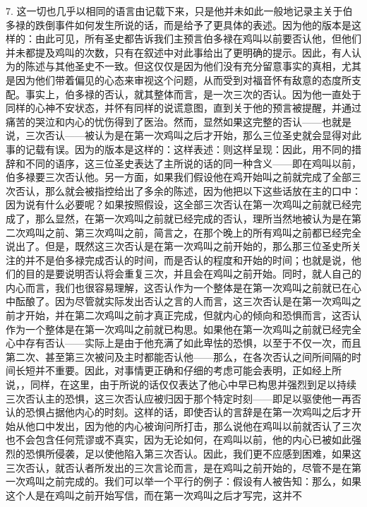 7. 这一切也几乎以相同的语言由记载下来，只是他并未如此一般地记录主关于伯多禄的跌倒事件如何发生所说的话，而是给予了更具体的表述。因为他的版本是这样的：由此可见，所有圣史都告诉我们主预言伯多禄在鸡叫以前要否认他，但他们并未都提及鸡叫的次数，只有在叙述中对此事给出了更明确的提示。因此，有人认为的陈述与其他圣史不一致。但这仅仅是因为他们没有充分留意事实的真相，尤其是因为他们带着偏见的心态来审视这个问题，从而受到对福音怀有敌意的态度所支配。事实上，伯多禄的否认，就其整体而言，是一次三次的否认。因为他一直处于同样的心神不安状态，并怀有同样的说谎意图，直到关于他的预言被提醒，并通过痛苦的哭泣和内心的忧伤得到了医治。然而，显然如果这完整的否认——也就是说，三次否认——被认为是在第一次鸡叫之后才开始，那么三位圣史就会显得对此事的记载有误。因为的版本是这样的：这样表述：则这样呈现：因此，用不同的措辞和不同的语序，这三位圣史表达了主所说的话的同一种含义——即在鸡叫以前，伯多禄要三次否认他。另一方面，如果我们假设他在鸡开始叫之前就完成了全部三次否认，那么就会被指控给出了多余的陈述，因为他把以下这些话放在主的口中：因为说有什么必要呢？如果按照假设，这全部三次否认在第一次鸡叫之前就已经完成了，那么显然，在第一次鸡叫之前就已经完成的否认，理所当然地被认为是在第二次鸡叫之前、第三次鸡叫之前，简言之，在那个晚上的所有鸡叫之前都已经完全说出了。但是，既然这三次否认是在第一次鸡叫之前开始的，那么那三位圣史所关注的并不是伯多禄完成否认的时间，而是否认的程度和开始的时间；也就是说，他们的目的是要说明否认将会重复三次，并且会在鸡叫之前开始。同时，就人自己的内心而言，我们也很容易理解，这否认作为一个整体是在第一次鸡叫之前就已在心中酝酿了。因为尽管就实际发出否认之言的人而言，这三次否认是在第一次鸡叫之前才开始，并在第二次鸡叫之前才真正完成，但就内心的倾向和恐惧而言，这否认作为一个整体是在第一次鸡叫之前就已构思。如果他在第一次鸡叫之前就已经完全心中存有否认——实际上是由于他充满了如此卑怯的恐惧，以至于不仅一次，而且第二次、甚至第三次被问及主时都能否认他——那么，在各次否认之间所间隔的时间长短并不重要。因此，对事情更正确和仔细的考虑可能会表明，正如经上所说，，同样，在这里，由于所说的话仅仅表达了他心中早已构思并强烈到足以持续三次否认主的恐惧，这三次否认应被归因于那个特定时刻——即足以驱使他一再否认的恐惧占据他内心的时刻。这样的话，即使否认的言辞是在第一次鸡叫之后才开始从他口中发出，因为他的内心被询问所打击，那么说他在鸡叫以前就否认了三次也不会包含任何荒谬或不真实，因为无论如何，在鸡叫以前，他的内心已被如此强烈的恐惧所侵袭，足以使他陷入第三次否认。因此，我们更不应感到困难，如果这三次否认，就否认者所发出的三次言论而言，是在鸡叫之前开始的，尽管不是在第一次鸡叫之前完成的。我们可以举一个平行的例子：假设有人被告知：那么，如果这个人是在鸡叫之前开始写信，而在第一次鸡叫之后才写完，这并不